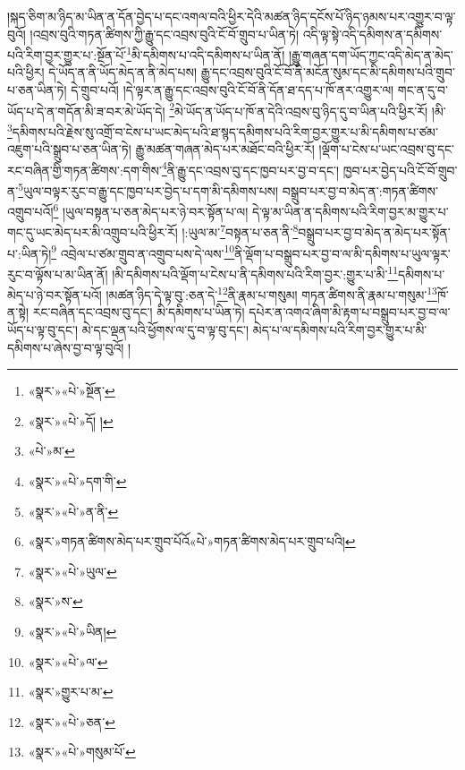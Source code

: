 །སྐད་ཅིག་མ་ཉིད་མ་ཡིན་ན་དོན་བྱེད་པ་དང་འགལ་བའི་ཕྱིར་དེའི་མཚན་ཉིད་དངོས་པོ་ཉིད་ཉམས་པར་འགྱུར་བ་ལྟ་བུའོ། །འབྲས་བུའི་གཏན་ཚིགས་ཀྱི་རྒྱུ་དང་འབྲས་བུའི་ངོ་བོ་གྲུབ་པ་ཡིན་ཏེ། འདི་ལྟ་སྟེ་འདི་དམིགས་ན་དམིགས་པའི་རིག་བྱར་གྱུར་པ་:སྔོན་པོ་\footnote{«སྣར་»«པེ་»སྔོན་}མི་དམིགས་པ་འདི་དམིགས་པ་ཡིན་ནོ། །རྒྱུ་གཞན་དག་ཡོད་ཀྱང་འདི་མེད་ན་མེད་པའི་ཕྱིར། དེ་ཡོད་ན་ནི་ཡོད་མེད་ན་ནི་མེད་པས། རྒྱུ་དང་འབྲས་བུའི་ངོ་བོ་ནི་མངོན་སུམ་དང་མི་དམིགས་པའི་གྲུབ་པ་ཅན་ཡིན་ཏེ། དེ་གྲུབ་པའོ། །དེ་ལྟར་ན་རྒྱུ་དང་འབྲས་བུའི་ངོ་བོ་ནི་དོན་ཐ་དད་པ་ཁོ་ནར་འགྱུར་ལ། གང་ན་དུ་བ་ཡོད་པ་དེ་ན་གདོན་མི་ཟ་བར་མེ་ཡོད་དེ། \footnote{«སྣར་»«པེ་»དོ། ། }མེ་ཡོད་ན་ཡོད་པ་ཁོ་ན་དེའི་འབྲས་བུ་ཉིད་དུ་བ་ཡིན་པའི་ཕྱིར་རོ། །མི་\footnote{«པེ་»མ་}དམིགས་པའི་རྗེས་སུ་འགྲོ་བ་ངེས་པ་ཡང་མེད་པའི་ཐ་སྙད་དམིགས་པའི་རིག་བྱར་གྱུར་པ་མི་དམིགས་པ་ཙམ་འཇུག་པའི་སྒྲུབ་པ་ཅན་ཡིན་ཏེ། རྒྱུ་མཚན་གཞན་མེད་པར་མཐོང་བའི་ཕྱིར་རོ། །ལྡོག་པ་ངེས་པ་ཡང་འབྲས་བུ་དང་རང་བཞིན་གྱི་གཏན་ཚིགས་:དག་གིས་\footnote{«སྣར་»«པེ་»དག་གི་}ནི་རྒྱུ་དང་འབྲས་བུ་དང་ཁྱབ་པར་བྱ་བ་དང་། ཁྱབ་པར་བྱེད་པའི་ངོ་བོ་གྲུབ་ན་\footnote{«སྣར་»«པེ་»ན་ནི་}ཡུལ་བལྟར་རུང་བ་རྒྱུ་དང་ཁྱབ་པར་བྱེད་པ་དག་མི་དམིགས་པས། བསྒྲུབ་པར་བྱ་བ་མེད་ན་:གཏན་ཚིགས་འགྲུབ་པའོ།\footnote{«སྣར་»གཏན་ཚིགས་མེད་པར་གྲུབ་པོའོ«པེ་»གཏན་ཚིགས་མེད་པར་གྲུབ་པའི།} །ཡུལ་བསྟན་པ་ཅན་མེད་པར་ཉེ་བར་སྟོན་པ་ལ། དེ་ལྟ་མ་ཡིན་ན་དམིགས་པའི་རིག་བྱར་མ་གྱུར་པ་གང་དུ་ཡང་མེད་པར་མི་འགྲུབ་པའི་ཕྱིར་རོ། །:ཡུལ་མ་\footnote{«སྣར་»«པེ་»ཡུལ་}བསྟན་པ་ཅན་ནི་\footnote{«སྣར་»ས་}བསྒྲུབ་པར་བྱ་བ་མེད་ན་མེད་པར་སྟོན་པ་:ཡིན་ཏེ།\footnote{«སྣར་»«པེ་»ཡིན།} འབྲེལ་པ་ཙམ་གྲུབ་ན་འགྲུབ་པས་དེ་ལས་\footnote{«སྣར་»«པེ་»ལ་}ནི་ལྡོག་པ་བསྒྲུབ་པར་བྱ་བ་ལ་མི་དམིགས་པ་ཡུལ་ལྟར་རུང་བ་ལྟོས་པ་མ་ཡིན་ནོ། །མི་དམིགས་པའི་ལྡོག་པ་ངེས་པ་ནི་དམིགས་པའི་རིག་བྱར་:གྱུར་པ་མི་\footnote{«སྣར་»གྱུར་པ་མ་}དམིགས་པ་མེད་པ་ཉེ་བར་སྟོན་པའོ། །མཚན་ཉིད་དེ་ལྟ་བུ་:ཅན་དེ་\footnote{«སྣར་»«པེ་»ཅན་}ནི་རྣམ་པ་གསུམ། གཏན་ཚིགས་ནི་རྣམ་པ་གསུམ་\footnote{«སྣར་»«པེ་»གསུམ་པོ་}ཁོ་ན་སྟེ། རང་བཞིན་དང་འབྲས་བུ་དང་། མི་དམིགས་པ་ཡིན་ཏེ། དཔེར་ན་འགའ་ཞིག་མི་རྟག་པ་བསྒྲུབ་པར་བྱ་བ་ལ་ཡོད་པ་ལྟ་བུ་དང་། མེ་དང་ལྡན་པའི་ཕྱོགས་ལ་དུ་བ་ལྟ་བུ་དང་། མེད་པ་ལ་དམིགས་པའི་རིག་བྱར་གྱུར་པ་མི་དམིགས་པ་ཞེས་བྱ་བ་ལྟ་བུའོ། །
